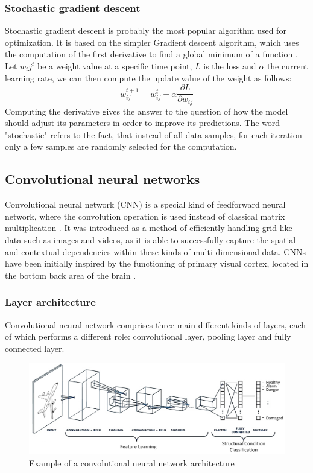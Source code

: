 \subsubsection*{Stochastic gradient descent}
Stochastic gradient descent is probably the most popular algorithm used for optimization. It is based on the simpler Gradient descent algorithm, which uses the computation of the first derivative to find a global minimum of a function \cite{deeplearningbook}. Let $w_ij^t$ be a weight value at a specific time point, $L$ is the loss and $\alpha$ the current learning rate, we can then compute the update value of the weight as follows:
\begin{equation}
w_{ij}^{t+1} = w_{ij}^{t} - \alpha \frac {\partial L}{\partial w_{ij}}   
\end{equation}
Computing the derivative gives the answer to the question of how the model should adjust its parameters in order to improve its predictions. The word "stochastic" refers to the fact, that instead of all data samples, for each iteration only a few samples are randomly selected for the computation.



\subsection{Convolutional neural networks}
Convolutional neural network (CNN) is a special kind of feedforward neural network, where the convolution operation is used instead of classical matrix multiplication \cite{deeplearningbook}. It was introduced as a method of efficiently handling grid-like data such as images and videos, as it is able to successfully capture the spatial and contextual dependencies within these kinds of 
multi-dimensional data. CNNs have been initially inspired by the functioning of primary visual cortex, located in the bottom back area of the brain \cite{deeplearningbook}.
\subsubsection{Layer architecture}
Convolutional neural network comprises three main different kinds of layers, each of which performs a different role: convolutional layer, pooling layer and fully connected layer.
\begin{figure}[!ht]
\centering
\includegraphics[width=15cm]{assets/images/CNN}
\caption{Example of a convolutional neural network architecture 
\label{fig:CNN}}
\end{figure}

